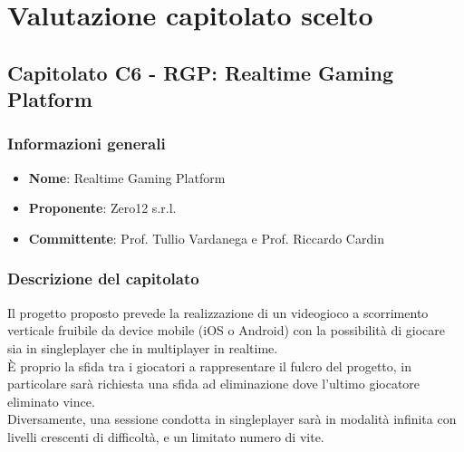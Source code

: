 \section{Valutazione capitolato scelto}
	\subsection{Capitolato C6 - RGP: Realtime Gaming Platform}
		\subsubsection{Informazioni generali}
			\begin{itemize}
				\item\textbf{Nome}: Realtime Gaming Platform
				\item\textbf{Proponente}: Zero12 s.r.l.
				\item\textbf{Committente}: Prof. Tullio Vardanega e Prof. Riccardo Cardin
			\end{itemize}
			
		\subsubsection{Descrizione del capitolato}
			Il progetto proposto prevede la realizzazione di un videogioco a scorrimento verticale fruibile da device mobile (iOS o Android) con la possibilità di giocare sia in singleplayer che in multiplayer in realtime. \\
			È proprio la sfida tra i giocatori a rappresentare il fulcro del progetto, in particolare sarà richiesta una sfida ad eliminazione dove l’ultimo giocatore eliminato vince. \\
			Diversamente, una sessione condotta in singleplayer sarà in modalità infinita con livelli crescenti di difficoltà, e un limitato numero di vite.\\
		
